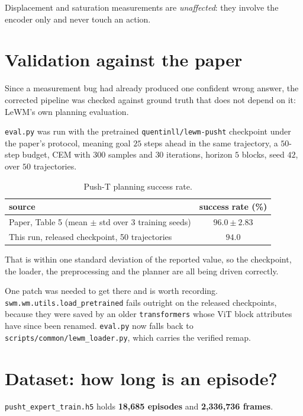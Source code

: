 \documentclass[11pt]{article}
\begin{document}
Displacement and saturation measurements are \emph{unaffected}: they involve the encoder only
and never touch an action.

\section{Validation against the paper}
\label{sec:validation}

Since a measurement bug had already produced one confident wrong answer, the corrected
pipeline was checked against ground truth that does not depend on it: LeWM's own planning
evaluation.

\texttt{eval.py} was run with the pretrained \texttt{quentinll/lewm-pusht} checkpoint under
the paper's protocol, meaning goal $25$ steps ahead in the same trajectory, a $50$-step
budget, CEM with $300$ samples and $30$ iterations, horizon $5$ blocks, seed $42$, over $50$
trajectories.

\begin{table}[H]
\centering
\small
\caption{Push-T planning success rate.}
\begin{tabular}{lc}
\toprule
source & success rate (\%) \\
\midrule
Paper, Table 5 (mean $\pm$ std over 3 training seeds) & $96.0 \pm 2.83$ \\
This run, released checkpoint, 50 trajectories & $\mathbf{94.0}$ \\
\bottomrule
\end{tabular}
\end{table}

That is within one standard deviation of the reported value, so the checkpoint, the loader,
the preprocessing and the planner are all being driven correctly.

One patch was needed to get there and is worth recording. \texttt{swm.wm.utils.load\_pretrained}
fails outright on the released checkpoints, because they were saved by an older
\texttt{transformers} whose ViT block attributes have since been renamed. \texttt{eval.py} now
falls back to \texttt{scripts/common/lewm\_loader.py}, which carries the verified remap.

\section{Dataset: how long is an episode?}

\texttt{pusht\_expert\_train.h5} holds \textbf{18{,}685 episodes} and \textbf{2{,}336{,}736
frames}.
\end{document}
